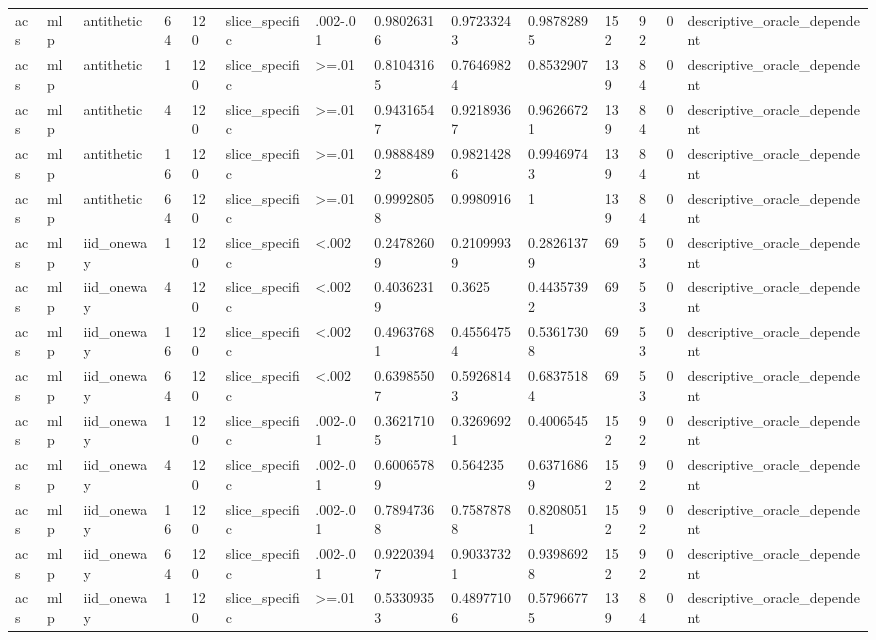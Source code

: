 \begin{tabular}{llllllllllllll}
acs & mlp & antithetic & 64 & 120 & slice\_specific & .002-.01 & 0.98026316 & 0.97233243 & 0.98782895 & 152 & 92 & 0 & descriptive\_oracle\_dependent \\
acs & mlp & antithetic & 1 & 120 & slice\_specific & >=.01 & 0.81043165 & 0.76469824 & 0.8532907 & 139 & 84 & 0 & descriptive\_oracle\_dependent \\
acs & mlp & antithetic & 4 & 120 & slice\_specific & >=.01 & 0.94316547 & 0.92189367 & 0.96266721 & 139 & 84 & 0 & descriptive\_oracle\_dependent \\
acs & mlp & antithetic & 16 & 120 & slice\_specific & >=.01 & 0.98884892 & 0.98214286 & 0.99469743 & 139 & 84 & 0 & descriptive\_oracle\_dependent \\
acs & mlp & antithetic & 64 & 120 & slice\_specific & >=.01 & 0.99928058 & 0.9980916 & 1 & 139 & 84 & 0 & descriptive\_oracle\_dependent \\
acs & mlp & iid\_oneway & 1 & 120 & slice\_specific & <.002 & 0.24782609 & 0.21099939 & 0.28261379 & 69 & 53 & 0 & descriptive\_oracle\_dependent \\
acs & mlp & iid\_oneway & 4 & 120 & slice\_specific & <.002 & 0.40362319 & 0.3625 & 0.44357392 & 69 & 53 & 0 & descriptive\_oracle\_dependent \\
acs & mlp & iid\_oneway & 16 & 120 & slice\_specific & <.002 & 0.49637681 & 0.45564754 & 0.53617308 & 69 & 53 & 0 & descriptive\_oracle\_dependent \\
acs & mlp & iid\_oneway & 64 & 120 & slice\_specific & <.002 & 0.63985507 & 0.59268143 & 0.68375184 & 69 & 53 & 0 & descriptive\_oracle\_dependent \\
acs & mlp & iid\_oneway & 1 & 120 & slice\_specific & .002-.01 & 0.36217105 & 0.32696921 & 0.4006545 & 152 & 92 & 0 & descriptive\_oracle\_dependent \\
acs & mlp & iid\_oneway & 4 & 120 & slice\_specific & .002-.01 & 0.60065789 & 0.564235 & 0.63716869 & 152 & 92 & 0 & descriptive\_oracle\_dependent \\
acs & mlp & iid\_oneway & 16 & 120 & slice\_specific & .002-.01 & 0.78947368 & 0.75878788 & 0.82080511 & 152 & 92 & 0 & descriptive\_oracle\_dependent \\
acs & mlp & iid\_oneway & 64 & 120 & slice\_specific & .002-.01 & 0.92203947 & 0.90337321 & 0.93986928 & 152 & 92 & 0 & descriptive\_oracle\_dependent \\
acs & mlp & iid\_oneway & 1 & 120 & slice\_specific & >=.01 & 0.53309353 & 0.48977106 & 0.57966775 & 139 & 84 & 0 & descriptive\_oracle\_dependent \\

\end{tabular}
